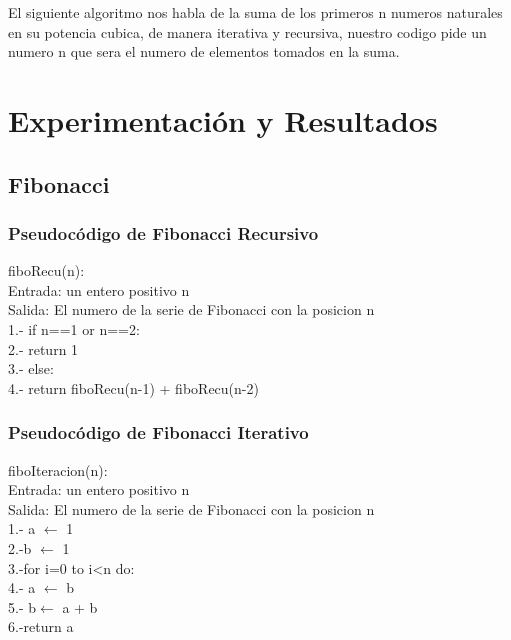 \documentclass[spanish]{article}
\begin{document}
	El siguiente algoritmo nos habla de la suma de los primeros n numeros naturales en su potencia cubica, de manera iterativa y recursiva, nuestro codigo pide un numero n que sera el numero de elementos tomados en la suma.
	
\newpage	
\section{Experimentaci\'on y Resultados}
	\subsection{Fibonacci}
	\subsubsection{Pseudocódigo de Fibonacci Recursivo}
	fiboRecu(n):\\
	Entrada: un entero positivo n\\
	Salida: El numero de la serie de Fibonacci con la posicion n \\
	1.- if n==1 or n==2:\\
	2.- \hspace{0.7cm}return 1\\
	3.- else:\\
	4.-  \hspace{0.7cm}return fiboRecu(n-1) + fiboRecu(n-2)\\	


	\subsubsection{Pseudocódigo de Fibonacci Iterativo}
	fiboIteracion(n):\\
	Entrada: un entero positivo n\\
	Salida: El numero de la serie de Fibonacci con la posicion n \\
	1.- a $\leftarrow$ 1\\
	2.-b $\leftarrow$ 1\\
	3.-for i=0 to i<n do:\\
	4.- \hspace{0.7cm}a $\leftarrow$ b \\
	5.- \hspace{0.7cm}b$\leftarrow$ a + b \\
	6.-return a
	
\end{document}
